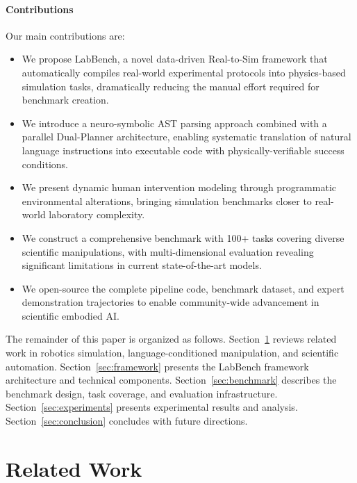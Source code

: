 \documentclass[letterpaper]{article} %
\begin{document}
\paragraph{Contributions}
Our main contributions are:
\begin{itemize}
    \item We propose LabBench, a novel data-driven Real-to-Sim framework that automatically compiles real-world experimental protocols into physics-based simulation tasks, dramatically reducing the manual effort required for benchmark creation.
    \item We introduce a neuro-symbolic AST parsing approach combined with a parallel Dual-Planner architecture, enabling systematic translation of natural language instructions into executable code with physically-verifiable success conditions.
    \item We present dynamic human intervention modeling through programmatic environmental alterations, bringing simulation benchmarks closer to real-world laboratory complexity.
    \item We construct a comprehensive benchmark with 100+ tasks covering diverse scientific manipulations, with multi-dimensional evaluation revealing significant limitations in current state-of-the-art models.
    \item We open-source the complete pipeline code, benchmark dataset, and expert demonstration trajectories to enable community-wide advancement in scientific embodied AI.
\end{itemize}

The remainder of this paper is organized as follows. Section~\ref{sec:related} reviews related work in robotics simulation, language-conditioned manipulation, and scientific automation. Section~\ref{sec:framework} presents the LabBench framework architecture and technical components. Section~\ref{sec:benchmark} describes the benchmark design, task coverage, and evaluation infrastructure. Section~\ref{sec:experiments} presents experimental results and analysis. Section~\ref{sec:conclusion} concludes with future directions.

\section{Related Work}
\label{sec:related}
\end{document}
